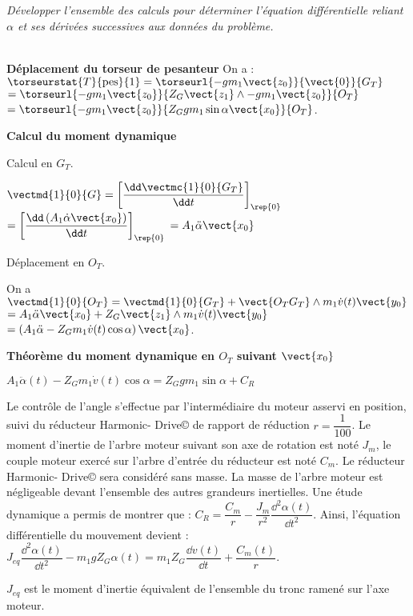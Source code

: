 \begin{multicols}{2}
\subparagraph{} \textit{Développer l'ensemble des calculs pour déterminer l'équation différentielle reliant $\alpha$ et ses dérivées
successives aux données du problème.}
\ifprof
\begin{corrige} ~\\

\textbf{Déplacement du torseur de pesanteur}
On a : $\torseurstat{T}{\text{pes}}{1} = \torseurl{-gm_1\vect{z_0}}{\vect{0}}{G_T}$ 
$= \torseurl{-gm_1\vect{z_0}}{Z_G \vect{z_1}\wedge -gm_1\vect{z_0}}{O_T}$
$= \torseurl{-gm_1\vect{z_0}}{Z_G gm_1\sin\alpha \vect{x_0}}{O_T}$.


\textbf{Calcul du moment dynamique} 

Calcul en $G_T$. 

$\vectmd{1}{0}{G} = \left[\dfrac{\dd \vectmc{1}{0}{G_T}}{\dd t}\right]_{\rep{0}}$ $=\left[\dfrac{\dd \left( A_1 \dot{\alpha}\vect{x_0}\right)}{\dd t}\right]_{\rep{0}}$
$= A_1 \ddot{\alpha}\vect{x_0}$

Déplacement en $O_T$. 

On a $\vectmd{1}{0}{O_T} = \vectmd{1}{0}{G_T} + \vect{O_T G_T}\wedge m_1 \dot{v}(t) \vect{y_0}$
$= A_1 \ddot{\alpha}\vect{x_0} + Z_G \vect{z_1} \wedge m_1 \dot{v}(t) \vect{y_0}$
$= \left(A_1 \ddot{\alpha} - Z_G   m_1 \dot{v}(t) \cos \alpha \right)\vect{x_0} $.


\textbf{Théorème du moment dynamique en $O_T$ suivant $\vect{x_0}$}

$A_1 \ddot{\alpha}(t) - Z_G   m_1 \dot{v}(t) \cos \alpha = Z_G gm_1\sin\alpha  +C_R $


\end{corrige}
\else
\fi


Le contrôle de l'angle s'effectue par l'intermédiaire du moteur asservi en position, suivi du réducteur Harmonic-
Drive© de rapport de réduction $r= \dfrac{1}{100}$. Le moment d'inertie de l'arbre moteur suivant son axe de rotation est
noté $J_m$, le couple moteur exercé sur l'arbre d'entrée du réducteur est noté $C_m$. Le réducteur Harmonic-
Drive© sera considéré sans masse. La masse de l'arbre moteur est négligeable devant l'ensemble des autres
grandeurs inertielles. Une étude dynamique a permis de montrer que : $C_R=\dfrac{C_m}{r}-\dfrac{J_m}{r^2}\dfrac{\dd^2\alpha(t)}{\dd t^2}$. Ainsi, l'équation
différentielle du mouvement devient : 
$J_{eq} \dfrac{\dd^2\alpha(t)}{\dd t^2} -m_1gZ_G\alpha(t)=m_1 Z_G \dfrac{\dd v(t)}{\dd t}+\dfrac{C_m(t)}{r}$.

$J_{eq}$ est le moment d'inertie équivalent de l'ensemble du tronc ramené sur l'axe moteur.



\end{multicols}
